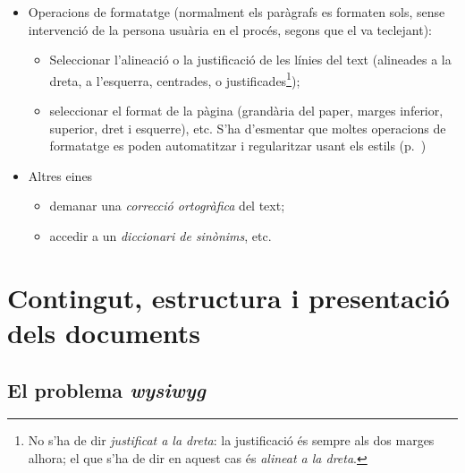 \begin{itemize}
\begin{itemize}
       \emph{punts}, 1 polzada = 2,54~cm = 72 punts)
     \item seleccionar la família tipogràfica (Times, Courier,
           Helvetica...)
         \item seleccionar l'estil de la lletra: redona, cursiva,
           negreta, subíndex, superíndex, etc.
     \end{itemize}
   \item Operacions de formatatge (normalment els paràgrafs es
     formaten sols, sense intervenció de la persona usuària en el
     procés, segons que el va teclejant):
     \begin{itemize}
     \item Seleccionar l'alineació o la justificació de
           les línies del text
           (alineades a la dreta, a l'esquerra, centrades, o
           justificades\footnote{No s'ha de dir \emph{justificat a la
               dreta}: la justificació és sempre als dos marges
             alhora; el que s'ha de dir en aquest cas és \emph{alineat
               a la dreta}.});
     \item seleccionar el format de la pàgina (grandària del
       paper, marges inferior,
       superior, dret i esquerre), etc.
     S'ha d'esmentar que moltes operacions de formatatge es poden
     automatitzar i regularitzar usant els estils (p.~\pageref{pg:estil})
     \end{itemize}
\item Altres eines
     \begin{itemize}
     \item  demanar una \emph{correcció ortogràfica} del text;
     \item accedir a un \emph{diccionari de sinònims}, etc.
     \end{itemize}
\end{itemize}

\section[Contingut, estructura i presentació]{Contingut, estructura i presentació dels documents}
\label{ss:separac}

\subsection{El problema \emph{wysiwyg}}
\label{s3:problema_wysiwyg}


